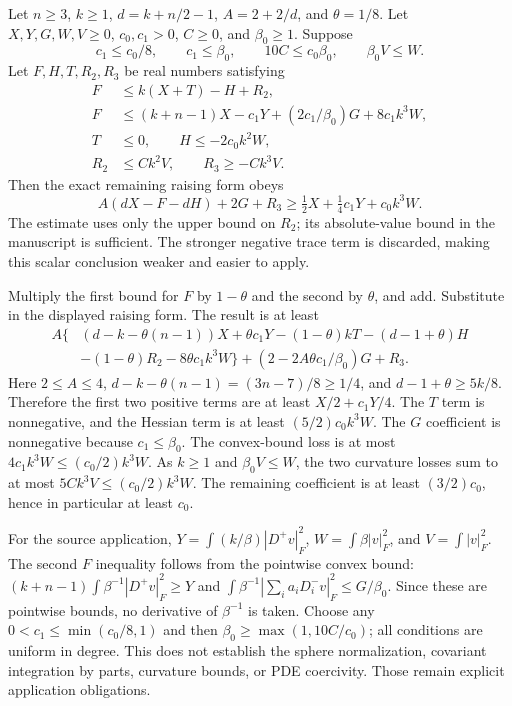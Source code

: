 \documentclass[11pt]{article}
\theoremstyle{definition}
\theoremstyle{remark}
\numberwithin{equation}{section}
\begin{document}
Let $n\ge3$, $k\ge1$, $d=k+n/2-1$, $A=2+2/d$, and
$\theta=1/8$. Let $X,Y,G,W,V\ge0$, $c_0,c_1>0$, $C\ge0$,
and $\beta_0\ge1$. Suppose
\[
 c_1\le c_0/8,\qquad c_1\le\beta_0,\qquad
 10C\le c_0\beta_0,\qquad \beta_0V\le W.
\]
Let $F,H,T,R_2,R_3$ be real numbers satisfying
\begin{align*}
 F&\le k(X+T)-H+R_2,\\
 F&\le(k+n-1)X-c_1Y+(2c_1/\beta_0)G+8c_1k^3W,\\
 T&\le0,\qquad H\le-2c_0k^2W,\\
 R_2&\le Ck^2V,\qquad R_3\ge-Ck^3V.
\end{align*}
Then the exact remaining raising form obeys
\[
 A(dX-F-dH)+2G+R_3\ge \tfrac12X+\tfrac14c_1Y+c_0k^3W.
\]
The estimate uses only the upper bound on $R_2$; its absolute-value
bound in the manuscript is sufficient. The stronger negative trace
term is discarded, making this scalar conclusion weaker and easier to apply.

Multiply the first bound for $F$ by $1-\theta$ and the second by
$\theta$, and add. Substitute in the displayed raising form. The result is
at least
\begin{align*}
 A\{&(d-k-\theta(n-1))X+\theta c_1Y
 -(1-\theta)kT-(d-1+\theta)H\\
 &-(1-\theta)R_2-8\theta c_1k^3W\}
 +(2-2A\theta c_1/\beta_0)G+R_3.
\end{align*}
Here $2\le A\le4$,
$d-k-\theta(n-1)=(3n-7)/8\ge1/4$, and
$d-1+\theta\ge5k/8$. Therefore the first two positive
terms are at least $X/2+c_1Y/4$. The $T$ term is nonnegative,
and the Hessian term is at least $(5/2)c_0k^3W$.
The $G$ coefficient is nonnegative because $c_1\le\beta_0$.
The convex-bound loss is at most $4c_1k^3W\le(c_0/2)k^3W$.
As $k\ge1$ and $\beta_0V\le W$, the two curvature losses sum to
at most $5Ck^3V\le(c_0/2)k^3W$. The remaining coefficient is
at least $(3/2)c_0$, hence in particular at least $c_0$.

For the source application,
$Y=\int(k/\beta)|D^+v|_F^2$,
$W=\int\beta|v|_F^2$, and $V=\int|v|_F^2$.
The second $F$ inequality follows from the pointwise convex bound:
$(k+n-1)\int\beta^{-1}|D^+v|_F^2\ge Y$ and
$\int\beta^{-1}|\sum_i a_iD_i^-v|_F^2\le G/\beta_0$.
Since these are pointwise bounds, no derivative of $\beta^{-1}$ is taken.
Choose any $0<c_1\le\min(c_0/8,1)$ and then
$\beta_0\ge\max(1,10C/c_0)$; all conditions are uniform in degree.
This does not establish the sphere normalization, covariant integration
by parts, curvature bounds, or PDE coercivity. Those remain explicit
application obligations.
\end{document}
